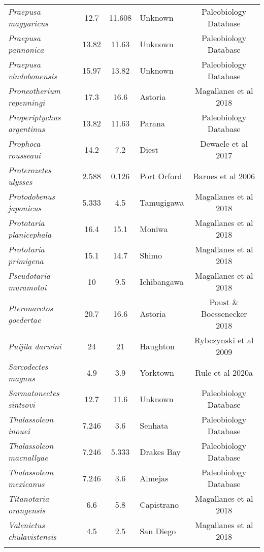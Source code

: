\begin{longtable}{p{}cclc}
\textit{Praepusa magyaricus} & 	12.7	&	11.608	&	Unknown	&	Paleobiology Database	\\
\textit{Praepusa pannonica} & 	13.82	&	11.63	&	Unknown	&	Paleobiology Database	\\
\textit{Praepusa vindobonensis} & 	15.97	&	13.82	&	Unknown	&	Paleobiology Database	\\
\textit{Proneotherium repenningi} & 	17.3	&	16.6	&	Astoria	&	Magallanes et al 2018	\\
\textit{Properiptychus argentinus} & 	13.82	&	11.63	&	Parana	&	Paleobiology Database	\\
\textit{Prophoca rousseaui} & 	14.2	&	7.2	&	Diest	&	Dewaele et al 2017	\\
\textit{Proterozetes ulysses} & 	2.588	&	0.126	&	Port Orford	&	Barnes et al 2006	\\
\textit{Protodobenus japonicus} & 	5.333	&	4.5	&	Tamugigawa	&	Magallanes et al 2018	\\
\textit{Prototaria planicephala} & 	16.4	&	15.1	&	Moniwa	&	Magallanes et al 2018	\\
\textit{Prototaria primigena} & 	15.1	&	14.7	&	Shimo	&	Magallanes et al 2018	\\
\textit{Pseudotaria muramotoi} & 	10	&	9.5	&	Ichibangawa	&	Magallanes et al 2018	\\
\textit{Pteronarctos goedertae} & 	20.7	&	16.6	&	Astoria	&	Poust \& Boessenecker 2018	\\
\textit{Puijila darwini} & 	24	&	21	&	Haughton	&	Rybczynski et al 2009	\\
\textit{Sarcodectes magnus} & 	4.9	&	3.9	&	Yorktown	&	Rule et al 2020a	\\
\textit{Sarmatonectes sintsovi} & 	12.7	&	11.6	&	Unknown	&	Paleobiology Database	\\
\textit{Thalassoleon inouei} & 	7.246	&	3.6	&	Senhata	&	Paleobiology Database	\\
\textit{Thalassoleon macnallyae} & 	7.246	&	5.333	&	Drakes Bay	&	Paleobiology Database	\\
\textit{Thalassoleon mexicanus} & 	7.246	&	3.6	&	Almejas	&	Paleobiology Database	\\
\textit{Titanotaria orangensis} & 	6.6	&	5.8	&	Capistrano	&	Magallanes et al 2018	\\
\textit{Valenictus chulavistensis} & 	4.5	&	2.5	&	San Diego	&	Magallanes et al 2018	\\
\hline
\label{table-stratigraphy}
\end{longtable}